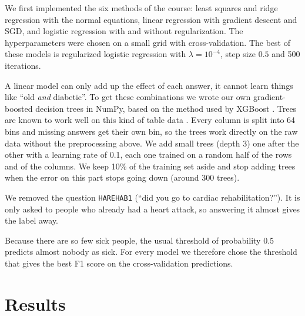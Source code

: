 \documentclass[11pt,a4paper]{article}
\begin{document}
We first implemented the six methods of the course: least squares and ridge regression with the normal equations, linear regression with gradient descent and SGD, and logistic regression with and without regularization. The hyperparameters were chosen on a small grid with cross-validation. The best of these models is regularized logistic regression with $\lambda=10^{-4}$, step size $0.5$ and 500 iterations.

A linear model can only add up the effect of each answer, it cannot learn things like ``old \emph{and} diabetic''. To get these combinations we wrote our own gradient-boosted decision trees in NumPy, based on the method used by XGBoost \cite{chen2016xgboost}. Trees are known to work well on this kind of table data \cite{grinsztajn2022tree}. Every column is split into 64 bins and missing answers get their own bin, so the trees work directly on the raw data without the preprocessing above. We add small trees (depth 3) one after the other with a learning rate of 0.1, each one trained on a random half of the rows and of the columns. We keep 10\% of the training set aside and stop adding trees when the error on this part stops going down (around 300 trees).

We removed the question \texttt{HAREHAB1} (``did you go to cardiac rehabilitation?''). It is only asked to people who already had a heart attack, so answering it almost gives the label away.

Because there are so few sick people, the usual threshold of probability 0.5 predicts almost nobody as sick. For every model we therefore chose the threshold that gives the best F1 score on the cross-validation predictions.

\section{Results}
\end{document}
